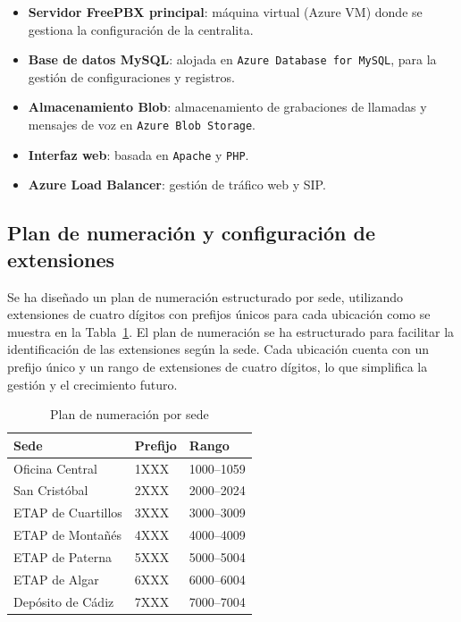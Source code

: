 \begin{itemize}
	\item \textbf{Servidor FreePBX principal}: máquina virtual (Azure VM) donde se gestiona la configuración de la centralita.
	\item \textbf{Base de datos MySQL}: alojada en \texttt{Azure Database for MySQL}, para la gestión de configuraciones y registros.
	\item \textbf{Almacenamiento Blob}: almacenamiento de grabaciones de llamadas y mensajes de voz en \texttt{Azure Blob Storage}.
	\item \textbf{Interfaz web}: basada en \texttt{Apache} y \texttt{PHP}.
	\item \textbf{Azure Load Balancer}: gestión de tráfico web y SIP.
\end{itemize}

\subsection{Plan de numeración y configuración de extensiones}
Se ha diseñado un plan de numeración estructurado por sede, utilizando extensiones de cuatro dígitos con prefijos únicos para cada ubicación como se muestra en la Tabla~\ref{tab:plan_numeracion}. El plan de numeración se ha estructurado para facilitar la identificación de las extensiones según la sede. Cada ubicación cuenta con un prefijo único y un rango de extensiones de cuatro dígitos, lo que simplifica la gestión y el crecimiento futuro.

\begin{table}[H]
	\centering
	\begin{tabular}{|l|l|l|}
		\hline
		\textbf{Sede}      & \textbf{Prefijo} & \textbf{Rango} \\ \hline
		Oficina Central    & 1XXX             & 1000--1059     \\ \hline
		San Cristóbal      & 2XXX             & 2000--2024     \\ \hline
		ETAP de Cuartillos & 3XXX             & 3000--3009     \\ \hline
		ETAP de Montañés   & 4XXX             & 4000--4009     \\ \hline
		ETAP de Paterna    & 5XXX             & 5000--5004     \\ \hline
		ETAP de Algar      & 6XXX             & 6000--6004     \\ \hline
		Depósito de Cádiz  & 7XXX             & 7000--7004     \\ \hline
	\end{tabular}
	\caption{Plan de numeración por sede}
	\label{tab:plan_numeracion}
\end{table}

